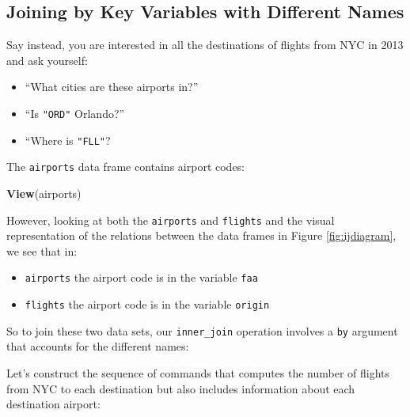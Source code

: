 \documentclass[]{tufte-book}
\newenvironment{Shaded}{\begin{snugshade}}{\end{snugshade}}
\newcommand{\KeywordTok}[1]{\textcolor[rgb]{0.13,0.29,0.53}{\textbf{{#1}}}}
\newcommand{\DataTypeTok}[1]{\textcolor[rgb]{0.13,0.29,0.53}{{#1}}}
\newcommand{\StringTok}[1]{\textcolor[rgb]{0.31,0.60,0.02}{{#1}}}
\newcommand{\NormalTok}[1]{{#1}}
\providecommand{\tightlist}{%
  \setlength{\itemsep}{0pt}\setlength{\parskip}{0pt}}
\begin{document}
\subsection{Joining by Key Variables with Different
Names}\label{joining-by-key-variables-with-different-names}

Say instead, you are interested in all the destinations of flights from
NYC in 2013 and ask yourself:

\begin{itemize}
\tightlist
\item
  ``What cities are these airports in?''
\item
  ``Is \texttt{"ORD"} Orlando?''
\item
  ``Where is \texttt{"FLL"}?
\end{itemize}

The \texttt{airports} data frame contains airport codes:

\begin{Shaded}
\begin{Highlighting}[]
\KeywordTok{View}\NormalTok{(airports)}
\end{Highlighting}
\end{Shaded}

However, looking at both the \texttt{airports} and \texttt{flights} and
the visual representation of the relations between the data frames in
Figure \ref{fig:ijdiagram}, we see that in:

\begin{itemize}
\tightlist
\item
  \texttt{airports} the airport code is in the variable \texttt{faa}
\item
  \texttt{flights} the airport code is in the variable \texttt{origin}
\end{itemize}

So to join these two data sets, our \texttt{inner\_join} operation
involves a \texttt{by} argument that accounts for the different names:

\begin{Shaded}
\end{Shaded}

Let's construct the sequence of commands that computes the number of
flights from NYC to each destination but also includes information about
each destination airport:
\end{document}
